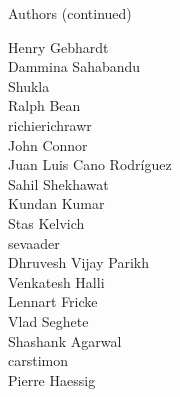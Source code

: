 \begin{frame}{Authors (continued)}
\begin{multicols}{5}
Henry Gebhardt\\
Dammina Sahabandu\\
Shukla\\
Ralph Bean\\
richierichrawr\\
John Connor\\
Juan Luis Cano Rodríguez\\
Sahil Shekhawat\\
Kundan Kumar\\
Stas Kelvich\\
sevaader\\
Dhruvesh Vijay Parikh\\
Venkatesh Halli\\
Lennart Fricke\\
Vlad Seghete\\
Shashank Agarwal\\
carstimon\\
Pierre Haessig\\
\end{multicols}
\end{frame}
